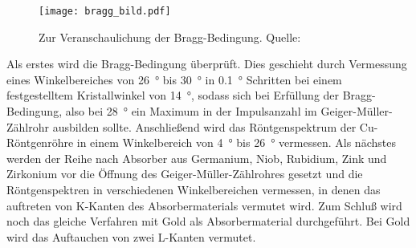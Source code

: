 %
%
\begin{figure}
\centering
\texttt{[image: bragg\_bild.pdf]}
\caption{Zur Veranschaulichung der Bragg-Bedingung. Quelle: \textcite{v602}}
\label{fig:bragg_bild}
\end{figure}
%
Als erstes wird die Bragg-Bedingung überprüft. Dies geschieht durch Vermessung eines Winkelbereiches von \SI{26}{\degree} bis \SI{30}{\degree} in \SI{0.1}{\degree} Schritten bei einem festgestelltem Kristallwinkel von \SI{14}{\degree}, sodass sich bei Erfüllung der Bragg-Bedingung, also bei \SI{28}{\degree} ein Maximum in der Impulsanzahl im Geiger-Müller-Zählrohr ausbilden sollte.
Anschließend wird das Röntgenspektrum der Cu-Röntgenröhre in einem Winkelbereich von \SI{4}{\degree} bis \SI{26}{\degree} vermessen.
Als nächstes werden der Reihe nach Absorber aus Germanium, Niob, Rubidium, Zink und Zirkonium vor die Öffnung des Geiger-Müller-Zählrohres gesetzt und die Röntgenspektren in verschiedenen Winkelbereichen vermessen, in denen das auftreten von K-Kanten des Absorbermaterials vermutet wird.
Zum Schluß wird noch das gleiche Verfahren mit Gold als Absorbermaterial durchgeführt. Bei Gold wird das Auftauchen von zwei L-Kanten vermutet.
%